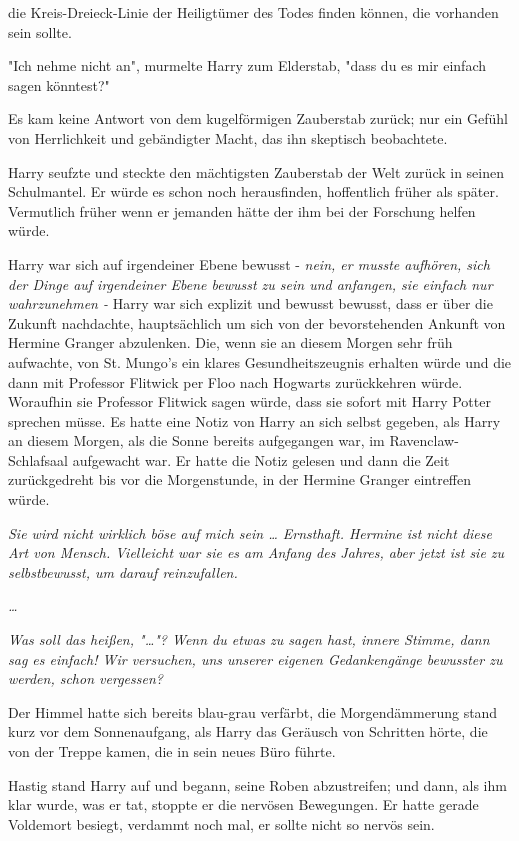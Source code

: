 {die Kreis-Dreieck-Linie der Heiligtümer des Todes finden können, die vorhanden sein sollte.

"Ich nehme nicht an", murmelte Harry zum Elderstab, "dass du es mir einfach sagen könntest?"

Es kam keine Antwort von dem kugelförmigen Zauberstab zurück; nur ein Gefühl von Herrlichkeit und gebändigter Macht, das ihn skeptisch beobachtete.

Harry seufzte und steckte den mächtigsten Zauberstab der Welt zurück in seinen Schulmantel. Er würde es schon noch herausfinden, hoffentlich früher als später. Vermutlich früher wenn er jemanden hätte der ihm bei der Forschung helfen würde.

Harry war sich auf irgendeiner Ebene bewusst - \emph{nein, er musste aufhören, sich der Dinge auf irgendeiner Ebene bewusst zu sein und anfangen, sie einfach nur wahrzunehmen -} Harry war sich explizit und bewusst bewusst, dass er über die Zukunft nachdachte, hauptsächlich um sich von der bevorstehenden Ankunft von Hermine Granger abzulenken. Die, wenn sie an diesem Morgen sehr früh aufwachte, von St. Mungo's ein klares Gesundheitszeugnis erhalten würde und die dann mit Professor Flitwick per Floo nach Hogwarts zurückkehren würde. Woraufhin sie Professor Flitwick sagen würde, dass sie sofort mit Harry Potter sprechen müsse. Es hatte eine Notiz von Harry an sich selbst gegeben, als Harry an diesem Morgen, als die Sonne bereits aufgegangen war, im Ravenclaw-Schlafsaal aufgewacht war. Er hatte die Notiz gelesen und dann die Zeit zurückgedreht bis vor die Morgenstunde, in der Hermine Granger eintreffen würde.

\emph{Sie wird nicht wirklich böse auf mich sein … Ernsthaft. Hermine ist nicht diese Art von Mensch. Vielleicht war sie es am Anfang des Jahres, aber jetzt ist sie zu selbstbewusst, um darauf reinzufallen.}

\emph{…}

\emph{Was soll das heißen, "…"? Wenn du etwas zu sagen hast, innere Stimme, dann sag es einfach! Wir versuchen, uns unserer eigenen Gedankengänge bewusster zu werden, schon vergessen?}

Der Himmel hatte sich bereits blau-grau verfärbt, die Morgendämmerung stand kurz vor dem Sonnenaufgang, als Harry das Geräusch von Schritten hörte, die von der Treppe kamen, die in sein neues Büro führte.

Hastig stand Harry auf und begann, seine Roben abzustreifen; und dann, als ihm klar wurde, was er tat, stoppte er die nervösen Bewegungen. Er hatte gerade Voldemort besiegt, verdammt noch mal, er sollte nicht so nervös sein.

}
